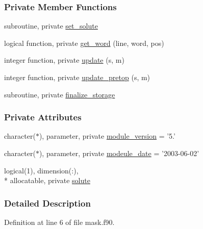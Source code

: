 \subsubsection*{Private Member Functions}
\begin{DoxyCompactItemize}
\item 
subroutine, private \hyperlink{classatom__mask_a4d3aff857c97591b916a1ee064cb7cef}{set\-\_\-solute}
\item 
logical function, private \hyperlink{classatom__mask_adfd3923e784e3ccdebf575c61257f0ea}{get\-\_\-word} (line, word, pos)
\item 
integer function, private \hyperlink{classatom__mask_a30b962d0b0f89f142ad386569bab3d42}{update} (s, m)
\item 
integer function, private \hyperlink{classatom__mask_ab6d589c395ac5883f6492a3bb59d61e7}{update\-\_\-pretop} (s, m)
\item 
subroutine, private \hyperlink{classatom__mask_a1f5d16022ce19bc3de0cba73139d6b04}{finalize\-\_\-storage}
\end{DoxyCompactItemize}
\subsubsection*{Private Attributes}
\begin{DoxyCompactItemize}
\item 
character($\ast$), parameter, private \hyperlink{classatom__mask_a64df9ccbd1b3413ead1e8f9b32220e4c}{module\-\_\-version} = '5.'
\item 
character($\ast$), parameter, private \hyperlink{classatom__mask_ab78bfda66e905ab2941b555acb0cad8e}{modeule\-\_\-date} = '2003-\/06-\/02'
\item 
logical(1), dimension(\-:), \\*
allocatable, private \hyperlink{classatom__mask_afd305ff17cef09bcbb0a2ee88bc47849}{solute}
\end{DoxyCompactItemize}


\subsubsection{Detailed Description}


Definition at line 6 of file mask.\-f90.



